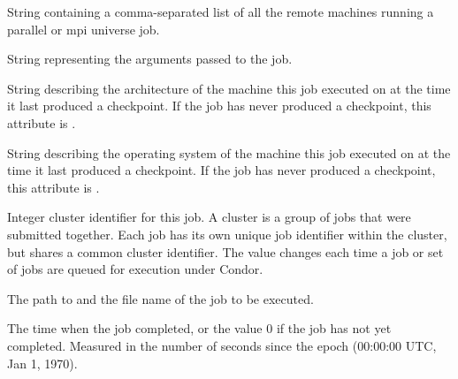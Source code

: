 \begin{description}


\item[\AdAttr{AllRemoteHosts}:]  String containing a comma-separated list
of all the remote machines running a parallel or mpi universe job.

\item[\AdAttr{Args}:]  String representing the arguments passed to the job.

\item[\AdAttr{CkptArch}:]  String describing the architecture of the machine
this job executed on at the time it last produced a checkpoint.
If the job has never produced a checkpoint,
this attribute is .

\item[\AdAttr{CkptOpSys}:]  String describing the operating system of
the machine
this job executed on at the time it last produced a checkpoint.
If the job has never produced a checkpoint,
this attribute is .

\item[\AdAttr{ClusterId}:]  Integer cluster identifier for this job.
A cluster is a group of jobs that were submitted together.  Each
job has its own unique job identifier within the cluster, but shares a
common cluster identifier.
The value changes each time a job or set of jobs are queued for
execution under Condor.

\item[\AdAttr{Cmd}:]  The path to and the file name of the job to be executed.

\item[\AdAttr{CompletionDate}:]  The time when the job completed,
or the value 0 if the job has not yet completed.
Measured in the
number of seconds since the epoch (00:00:00 UTC, Jan 1, 1970).


\end{description}
